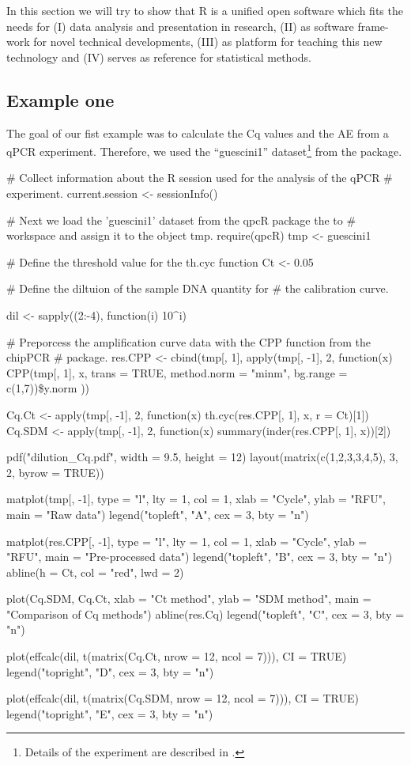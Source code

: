 In this section we will try to show that R is a unified open software which fits 
the needs for (I) data analysis and presentation in research, (II) as software 
frame-work for novel technical developments, (III) as platform for teaching this 
new technology and (IV) serves as reference for statistical methods.

\subsection{Example one}

The goal of our fist example was to calculate the Cq values and the AE from a 
qPCR experiment. Therefore, we used the ``guescini1'' dataset\footnote{Details 
of the experiment are described in \citet{guescini_2008}.} from the 
 package.

\begin{example}
# Collect information about the R session used for the analysis of the qPCR
# experiment.
current.session <- sessionInfo()

# Next we load the 'guescini1' dataset from the qpcR package the to
# workspace and assign it to the object tmp.
require(qpcR)
tmp <- guescini1

# Define the threshold value for the th.cyc function
Ct <- 0.05

# Define the diltuion of the sample DNA quantity for
# the calibration curve.

dil <- sapply((2:-4), function(i) {10^i})

# Preporcess the amplification curve data with the CPP function from the chipPCR
# package.
res.CPP <- cbind(tmp[, 1], apply(tmp[, -1], 2, function(x) {
    CPP(tmp[, 1], x, trans = TRUE, method.norm = "minm", bg.range = c(1,7))\$y.norm
}))

Cq.Ct <- apply(tmp[, -1], 2, function(x) {th.cyc(res.CPP[, 1], x, r = Ct)[1]})
Cq.SDM <- apply(tmp[, -1], 2, function(x) {summary(inder(res.CPP[, 1], x))[2]})

pdf("dilution_Cq.pdf", width = 9.5, height = 12)
layout(matrix(c(1,2,3,3,4,5), 3, 2, byrow = TRUE))

matplot(tmp[, -1], type = "l", lty = 1, col = 1, xlab = "Cycle", 
	    ylab = "RFU", main = "Raw data")
legend("topleft", "A", cex = 3, bty = "n")

matplot(res.CPP[, -1], type = "l", lty = 1, col = 1, xlab = "Cycle", 
	ylab = "RFU", main = "Pre-processed data")
legend("topleft", "B", cex = 3, bty = "n")
abline(h = Ct, col = "red", lwd = 2)

plot(Cq.SDM, Cq.Ct, xlab = "Ct method", ylab = "SDM method", 
     main = "Comparison of Cq methods")
abline(res.Cq)
legend("topleft", "C", cex = 3, bty = "n")

plot(effcalc(dil, t(matrix(Cq.Ct, nrow = 12, ncol = 7))), CI = TRUE)
legend("topright", "D", cex = 3, bty = "n")

plot(effcalc(dil, t(matrix(Cq.SDM, nrow = 12, ncol = 7))), CI = TRUE)
legend("topright", "E", cex = 3, bty = "n")
\end{example}

